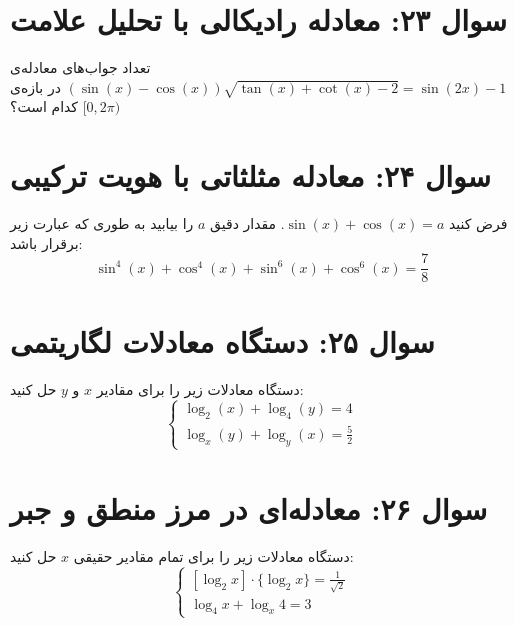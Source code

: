 \documentclass[12pt]{article}
\begin{document}
	\section*{سوال ۲۳: معادله رادیکالی با تحلیل علامت}
	تعداد جواب‌های معادله‌ی \( (\sin(x) - \cos(x)) \sqrt{\tan(x) + \cot(x) - 2} = \sin(2x) - 1 \) در بازه‌ی \( [0, 2\pi) \) کدام است؟
	
	\vspace{1cm}
	\hrulefill
	\vspace{1cm}
	\section*{سوال ۲۴: معادله مثلثاتی با هویت ترکیبی}
	فرض کنید \( \sin(x) + \cos(x) = a \). مقدار دقیق \( a \) را بیابید به طوری که عبارت زیر برقرار باشد:
	\[
	\sin^4(x) + \cos^4(x) + \sin^6(x) + \cos^6(x) = \frac{7}{8}
	\]
	\vspace{1cm}
	\hrulefill
	\vspace{1cm}
	\section*{سوال ۲۵: دستگاه معادلات لگاریتمی}
	دستگاه معادلات زیر را برای مقادیر \(x\) و \(y\) حل کنید:
	\begin{displaymath}
		\begin{cases}
			\log_{2}(x) + \log_{4}(y) = 4 \\
			\log_{x}(y) + \log_{y}(x) = \frac{5}{2}
		\end{cases}
	\end{displaymath}
	
	\vspace{1cm}
	\hrulefill
	\vspace{1cm}
	
	\section*{سوال ۲۶: معادله‌ای در مرز منطق و جبر}
	دستگاه معادلات زیر را برای تمام مقادیر حقیقی \(x\) حل کنید:
	\begin{displaymath}
		\begin{cases}
			[\log_{2}x] \cdot \{\log_{2}x\} = \frac{1}{\sqrt{2}} \\
			\log_{4}x + \log_{x}4 = 3
		\end{cases}
	\end{displaymath}
\end{document}
